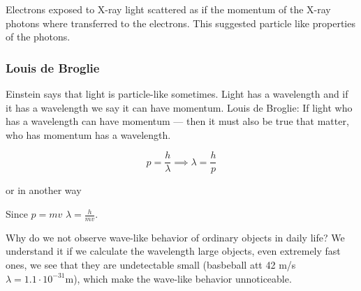 \documentclass[../mit-general-chemistry.tex]{subfiles}
\begin{document}
\begin{hfigure}
  \begin{center}
  \end{center}
  \caption{
    Electrons exposed to X-ray light scattered as if the momentum of
    the X-ray photons where transferred to the electrons. This
    suggested particle like properties of the photons.
  }
\end{hfigure}



\subsubsection{Louis de Broglie}

Einstein says that light is particle-like sometimes. Light has a
wavelength and if it has a wavelength we say it can have
momentum. Louis de Broglie: If light who has a wavelength can have
momentum --- then it must also be true that matter, who has momentum
has a wavelength.

\begin{equation}
  p = \frac{h}{\lambda} \implies \lambda = \frac{h}{p}
\end{equation}

or in another way

Since $p = mv$ $\lambda = \frac{h}{mv}$.

Why do we not observe wave-like behavior of ordinary objects in daily
life? We understand it if we calculate the wavelength large objects,
even extremely fast ones, we see that they are undetectable small
(basbeball att 42 m/s $\lambda = 1.1\cdot 10^{-31} \si{\meter}$),
which make the wave-like behavior unnoticeable.
\end{document}
